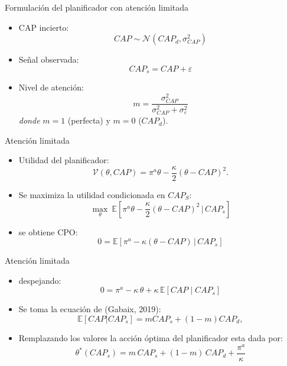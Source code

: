 \documentclass[xcolor=dvipsnames]{beamer}
\begin{document}
\begin{frame}{Formulación del planificador con atención limitada}
\small
\begin{itemize}
    \item CAP incierto:
    \[
        CAP \sim \mathcal{N}(CAP_d,\sigma_{CAP}^2)
    \]
    \item Señal observada:
    \[
        CAP_s = CAP + \varepsilon
    \]
    \item Nivel de atención:
    \[
        m = \frac{\sigma_{CAP}^2}{\sigma_{CAP}^2 + \sigma_\varepsilon^2}
    \]
    \textit{donde } $m=1$ (perfecta) y $m=0$ ($CAP_d$).
\end{itemize}
\end{frame}
\begin{frame}{Atención limitada}
\small
\begin{itemize}
    \item Utilidad del planificador:
    \[
        \mathcal{V}(\theta,CAP) = \pi^a \theta - \frac{\kappa}{2}(\theta - CAP)^2.
    \]
    \item Se maximiza la utilidad condicionada en $CAP_S$:
    \[
        \max_{\theta} \ \mathbb{E}\!\left[\pi^a \theta - \frac{\kappa}{2}(\theta-CAP)^2 \,\bigg|\,CAP_s\right]
    \]
    \item se obtiene CPO:
    \[
        0=\mathbb{E}\!\left[\pi^a - \kappa(\theta - CAP)\,\bigg|\,CAP_s\right]
    \]

\end{itemize}
\end{frame}


\begin{frame}{Atención limitada}
\small
\begin{itemize}
    \item despejando:
    \[
        0 
        = \pi^a - \kappa\,\theta + \kappa\,\mathbb{E}[CAP \mid CAP_s]
    \]
        \item Se toma la ecuación de (Gabaix, 2019):
    \[
    \mathbb{E}\left[CAP|CAP_s\right] = m CAP_s+ (1 - m)CAP_d,
    \]
    \item Remplazando los valores la acción óptima del planificador esta dada por:
    \[
        \theta^*(CAP_s) = m\,CAP_s + (1-m)\,CAP_d + \frac{\pi^a}{\kappa}
    \]

\end{itemize}
\end{frame}
\end{document}
